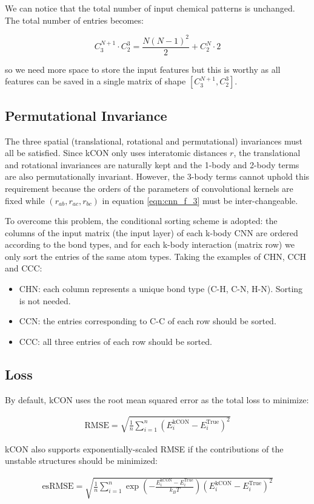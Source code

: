 \noindent We can notice that the total number of input chemical patterns is unchanged. The 
total number of entries becomes:

\begin{equation}
C^{N+1}_3 \cdot C^3_2 = \frac{N(N-1)^2}{2} + C^N_2 \cdot 2
\end{equation}

\noindent so we need more space to store the input features but this is worthy as all features 
can be saved in a single matrix of shape $[C^{N+1}_3, C^3_2]$.

\subsection{Permutational Invariance}

The three spatial (translational, rotational and permutational) invariances must all be 
satisfied. Since kCON only uses interatomic distances $r$, the translational and 
rotational invariances are naturally kept and the 1-body and 2-body terms are also 
permutationally invariant. However, the 3-body terms cannot uphold this
requirement because the orders of the parameters of convolutional kernels are fixed 
while $(r_{ab}, r_{ac}, r_{bc})$ in equation \ref{eqn:cnn_f_3} must be inter-changeable.

To overcome this problem, the conditional sorting scheme is adopted: the columns of the 
input matrix (the input layer) of each k-body CNN are ordered according to the bond types, 
and for each k-body interaction (matrix row) we only sort the  entries of the same atom 
types. Taking the examples of CHN, CCH and CCC:

\begin{itemize}
	\item CHN: each column represents a unique bond type (C-H, C-N, H-N). Sorting is not needed.
	\item CCN: the entries corresponding to C-C of each row should be sorted.
	\item CCC: all three entries of each row should be sorted.
\end{itemize}

\subsection{Loss}

By default, kCON uses the root mean squared error as the total loss to minimize:

\begin{eqnarray}
\mathrm{RMSE} = \sqrt{
	\frac{1}{n}
	\sum_{i=1}^{n}{ 
		\left( E_{i}^{\mathrm{kCON}} - E_{i}^{\mathrm{True}} \right)^2
	}
}	
\end{eqnarray}

\noindent kCON also supports exponentially-scaled RMSE if the contributions of the unstable 
structures should be minimized:

\begin{eqnarray}
\mathrm{esRMSE} = \sqrt{
	\frac{1}{n} 
	\sum_{i=1}^{n}{
		\exp{\left(-\frac{E_{i}^{\mathrm{kCON}} - E_{i}^{\mathrm{True}}}{k_BT} \right)}
		\left(E_{i}^{\mathrm{kCON}} - E_{i}^{\mathrm{True}} \right)^2
	}
}	
\end{eqnarray}
